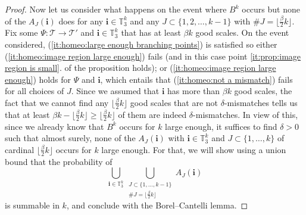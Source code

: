 \documentclass[11pt]{article}
\newcommand{\Tt}{\mathcal{T}}
\newcommand{\ii}{\mathbf{i}}
\theoremstyle{plain}
\theoremstyle{definition}
\numberwithin{equation}{section}
\begin{document}
\begin{proof}
Now let us consider what happens on the event where $B^k$ occurs but none of the $A_J(\ii)$ does for any $\ii \in \mathbb{T}_3^k$ and any $J\subset \{ 1,2,\dots, k-1\}$ with $\#J=\lfloor \frac{\beta}{2} k \rfloor$.
Fix some $\Psi:\Tt\rightarrow \Tt'$ and $\ii \in \mathbb{T}_3^k$ that has at least $\beta k$ good scales.
On the event considered, (\ref{it:homeo:large enough branching points}) is satisfied so either (\ref{it:homeo:image region large enough}) fails (and in this case point \ref{it:prop:image region is small}. of the proposition holds); or (\ref{it:homeo:image region large enough}) holds for $\Psi$ and $\ii$, which entails that (\ref{it:homeo:not a mismatch}) fails for all choices of $J$.
Since we assumed that $\ii$ has more than $\beta k$ good scales, the fact that we cannot find any $\lfloor \frac{\beta}{2}k\rfloor$ good scales that are not $\delta$-mismatches tells us that at least $\beta k - \lfloor \frac{\beta}{2}k\rfloor\geq \lfloor\frac{\beta}{2}k\rfloor$ of them are indeed $\delta$-mismatches.
In view of this, since we already know that $B^k$ occurs for $k$ large enough, it suffices to find $\delta>0$ such that almost surely, none of the $A_J(\ii)$ with $\ii \in \mathbb{T}_3^k$ and $J \subset \{1,\dots,k\}$ of cardinal $\lfloor \frac{\beta}{2}k \rfloor$ occurs for $k$ large enough. For that, we will show using a union bound that the probability of
\begin{equation}\label{eqn_rewriting_event_Aij}
\bigcup_{\ii \in \mathbb{T}_3^k} \bigcup_{\substack{J \subset \{1,\dots,k-1\}\\ \#J=\lfloor\frac{\beta}{2} k\rfloor }} A_J(\ii)
\end{equation}
is summable in $k$, and conclude with the Borel--Cantelli lemma.


\end{proof}
\end{document}
